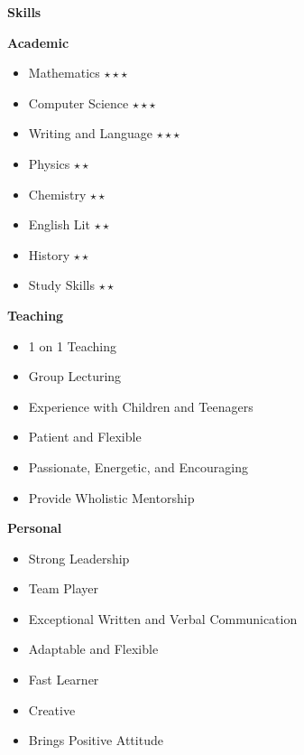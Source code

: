\documentclass[11pt,a4paper,sans]{article}
\newcommand{\cvcolor}[1]{{\color{MidnightBlue}#1}}
\renewcommand{\section}[1]{
  \cvcolor{\noindent \textbf{\LARGE #1}}
  \vspace{.5em}\\
}
\renewcommand{\subsection}[1]{
  \cvcolor{\noindent \textbf{\large #1} \dotfill}
  \\
}
\begin{document}
\section{Skills}
\vspace{-2.5em}
\begin{multicols}{3}
  \subsection{Academic}
  \vspace{-1em}
  \begin{itemize}[leftmargin=*]
    \item Mathematics           \hfill $\star\star\star$
    \item Computer Science      \hfill $\star\star\star$
    \item Writing and Language  \hfill $\star\star\star$
    \item Physics               \hfill $\star\star$
    \item Chemistry             \hfill $\star\star$
    \item English Lit           \hfill $\star\star$
    \item History               \hfill $\star\star$
    \item Study Skills          \hfill $\star\star$
  \end{itemize}

  \vfill\null
  \columnbreak

  \subsection{Teaching}
  \vspace{-1em}
  \begin{itemize}[leftmargin=*]
    \item 1 on 1 Teaching
    \item Group Lecturing
    \item Experience with Children and Teenagers
    \item Patient and Flexible
    \item Passionate, Energetic, and Encouraging
    \item Provide Wholistic Mentorship
  \end{itemize}

  \vfill\null
  \columnbreak

  \subsection{Personal}
  \vspace{-1em}
  \begin{itemize}[leftmargin=*]
    \item Strong Leadership
    \item Team Player
    \item Exceptional Written and Verbal Communication
    \item Adaptable and Flexible
    \item Fast Learner
    \item Creative
    \item Brings Positive Attitude
  \end{itemize}


\end{multicols}
\end{document}
